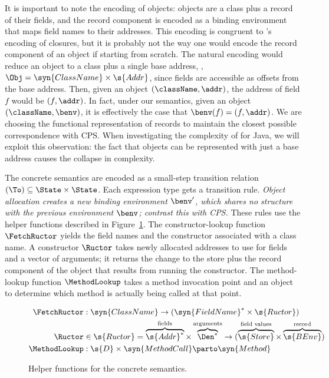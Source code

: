 It is important to note the encoding of objects:
objects are a class plus a record of their fields, and
the record component is encoded as a binding environment that maps
field names to their addresses.
This encoding is congruent to \kCFA's encoding of closures, but it is
probably not the way one would encode the record component of an
object if starting from scratch.
The natural encoding would reduce an object to a class plus a single
base address, \ie, $\Obj = \syn{ClassName} \times \s{Addr}$, since
fields are accessible as offsets from the base address.
Then, given an object $(\className,\addr)$, the address of field $f$
would be $(f,\addr)$.
In fact, under our semantics, given an object $(\className,\benv)$, it
is effectively the case that $\benv(f) = (f,\addr)$.
We are choosing the functional representation of records to
maintain the closest possible correspondence with CPS. 
When investigating the complexity of \kCFA{} for Java, we will exploit
this observation: the fact that objects can be represented with just
a base address causes the collapse in complexity.


The concrete semantics are encoded as a small-step transition relation
$(\To) \subseteq \State \times \State$.
Each expression type gets a transition rule.
\emph{Object allocation creates a new binding environment
  $\benv'$, which shares no structure with the previous environment
  $\benv$; contrast this with CPS.}
These rules use the helper functions described in
Figure~\ref{fig:concrete-anfw-java-helper}.
The constructor-lookup function $\FetchRuctor$ yields the field names
and the constructor associated with a class name.
A constructor $\Ructor$ takes newly allocated addresses to use for
fields and a vector of arguments; it returns the change to the store
plus the record component of the object that results from running the
constructor.
The method-lookup function $\MethodLookup$ takes a method invocation point and an
object to determine which method is actually being called at that
point.



\begin{figure}
  \begin{small}\begin{align*}
\FetchRuctor &: \syn{ClassName} \to (\syn{FieldName}^* \times \s{Ructor})
    \\
  \Ructor &\in 
  \s{Ructor} = 
  \overbrace{\s{Addr}^*}^{\text{fields}} 
  \times 
  \overbrace{\Den^*}^{\text{arguments}}
  \to
  (
  \overbrace{
\s{Store}
  }^{\text{field values}}
  \times 
  \overbrace{
\s{BEnv}
  }^{\text{record}}
  )
  \\
  \MethodLookup & : \s{D} \times \syn{MethodCall} \parto \syn{Method}
  \end{align*}\end{small}


  \caption{Helper functions for the concrete semantics.}
  \label{fig:concrete-anfw-java-helper}
\end{figure}





